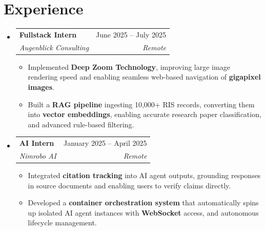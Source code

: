 \documentclass[letterpaper,11pt]{article}
\makeatletter
\newcommand{\resumeItem}[1]{
  \item\normalsize{
    {#1 \vspace{-2pt}}
  }
}
\newcommand{\resumeSubheading}[4]{
  \vspace{-2pt}\item
    \begin{tabular*}{0.97\textwidth}[t]{l@{\extracolsep{\fill}}r}
      \textbf{#1} & #2 \\
      \textit{\normalsize#3} & \textit{\normalsize #4} \\
    \end{tabular*}\vspace{-7pt}
}
\newcommand{\resumeSubHeadingListStart}{\begin{itemize}[leftmargin=0.15in, label={}]}
\newcommand{\resumeSubHeadingListEnd}{\end{itemize}}
\newcommand{\resumeItemListStart}{\begin{itemize}}
\newcommand{\resumeItemListEnd}{\end{itemize}\vspace{-5pt}}
\makeatother
\begin{document}
\section{Experience}
  \resumeSubHeadingListStart
    \resumeSubheading
      {Fullstack Intern}{June 2025 -- July 2025}
      {Augenblick Consulting}{Remote}
      \resumeItemListStart
          \resumeItem{Implemented \textbf{Deep Zoom Technology}, improving large image rendering speed and enabling seamless web-based navigation of \textbf{gigapixel images}.}        
          \resumeItem{Built a \textbf{RAG pipeline} ingesting 10,000+ RIS records, converting them into \textbf{vector embeddings}, enabling accurate research paper classification, and advanced rule-based filtering.}
      \resumeItemListEnd
  \vspace{2pt}
    \resumeSubheading
      {AI Intern}{January 2025 -- April 2025}
      {Nimrobo AI}{Remote}
      \resumeItemListStart
            \resumeItem{Integrated \textbf{citation tracking} into AI agent outputs, grounding responses in source documents and enabling users to verify claims directly.}
            \resumeItem{Developed a \textbf{container orchestration system} that automatically spins up isolated AI agent instances with \textbf{WebSocket} access, and autonomous lifecycle management.}
    \resumeItemListEnd


  \resumeSubHeadingListEnd


\end{document}
